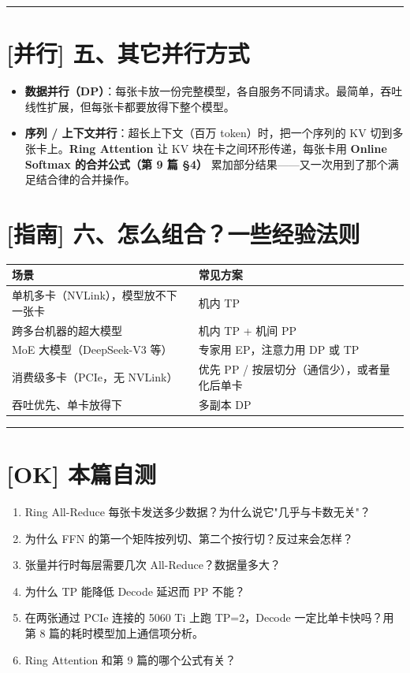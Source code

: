 \vspace{0.8em}\hrule\vspace{0.8em}

\section{[并行] 五、其它并行方式}

\begin{itemize}
  \item \textbf{数据并行（DP）}：每张卡放一份完整模型，各自服务不同请求。最简单，吞吐线性扩展，但每张卡都要放得下整个模型。
  \item \textbf{序列 / 上下文并行}：超长上下文（百万 token）时，把一个序列的 KV 切到多张卡上。\textbf{Ring Attention} 让 KV 块在卡之间环形传递，每张卡用 \textbf{Online Softmax 的合并公式（第 9 篇 §4）} 累加部分结果——又一次用到了那个满足结合律的合并操作。
\end{itemize}

\section{[指南] 六、怎么组合？一些经验法则}

\begin{center}
\small
\begin{tabularx}{\textwidth}{p{3.5cm} X}
\toprule
\textbf{场景} & \textbf{常见方案} \\
\midrule
单机多卡（NVLink），模型放不下一张卡 & 机内 TP \\
跨多台机器的超大模型 & 机内 TP + 机间 PP \\
MoE 大模型（DeepSeek-V3 等） & 专家用 EP，注意力用 DP 或 TP \\
消费级多卡（PCIe，无 NVLink） & 优先 PP / 按层切分（通信少），或者量化后单卡 \\
吞吐优先、单卡放得下 & 多副本 DP \\
\bottomrule
\end{tabularx}
\end{center}

\vspace{0.8em}\hrule\vspace{0.8em}

\section{[OK] 本篇自测}

\begin{enumerate}
  \item Ring All-Reduce 每张卡发送多少数据？为什么说它"几乎与卡数无关"？
  \item 为什么 FFN 的第一个矩阵按列切、第二个按行切？反过来会怎样？
  \item 张量并行时每层需要几次 All-Reduce？数据量多大？
  \item 为什么 TP 能降低 Decode 延迟而 PP 不能？
  \item 在两张通过 PCIe 连接的 5060 Ti 上跑 TP=2，Decode 一定比单卡快吗？用第 8 篇的耗时模型加上通信项分析。
  \item Ring Attention 和第 9 篇的哪个公式有关？
\end{enumerate}

